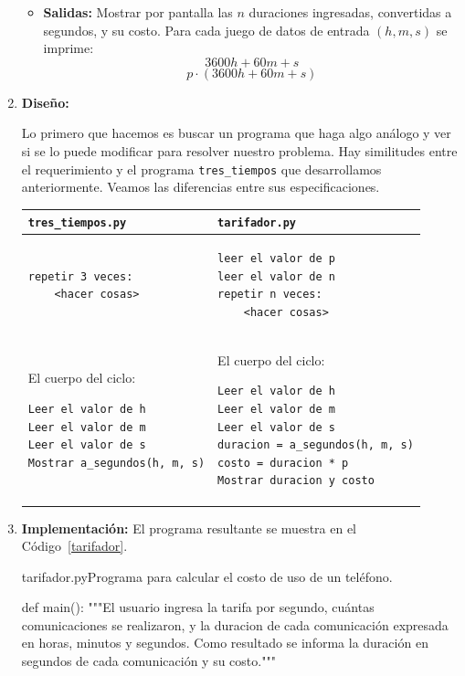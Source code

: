 \begin{solucion}
\begin{enumerate}
\begin{itemize}
\item {\bf Salidas: } Mostrar por pantalla las $n$ duraciones ingresadas, convertidas a segundos,
y su costo.
Para cada juego de datos de entrada $(h, m, s)$ se imprime:
$$ 3600 h + 60 m + s $$
$$ p \cdot (3600 h + 60 m + s) $$
\end{itemize}

\item {\bf Diseño:}

Lo primero que hacemos es buscar un programa que haga algo análogo y ver si se
lo puede modificar para resolver nuestro problema.  Hay similitudes entre el requerimiento
y el programa \lstinline+tres_tiempos+ que desarrollamos anteriormente. 
Veamos las diferencias entre sus especificaciones.

\begin{center}
\begin{tabular}{p{} p{}}
\lstinline!tres_tiempos.py! & \lstinline!tarifador.py!
\\
\hline
\begin{verbatim}
repetir 3 veces:
    <hacer cosas>
\end{verbatim}
&
\begin{verbatim}
leer el valor de p
leer el valor de n
repetir n veces:
    <hacer cosas>
\end{verbatim}
\\
\hline
El cuerpo del ciclo:
{\footnotesize
\begin{verbatim}
Leer el valor de h
Leer el valor de m
Leer el valor de s
Mostrar a_segundos(h, m, s)
\end{verbatim}
} &
El cuerpo del ciclo:
{\footnotesize
\begin{verbatim}
Leer el valor de h
Leer el valor de m
Leer el valor de s
duracion = a_segundos(h, m, s)
costo = duracion * p
Mostrar duracion y costo
\end{verbatim}
} \\
\end{tabular}
\end{center}

\item {\bf Implementación:} El programa resultante se muestra en el Código~\ref{tarifador}.

\begin{codigo}{\label{tarifador} tarifador.py}{Programa para calcular el costo
    de uso de un teléfono.}
\begin{codigo-python}
def main():
    """El usuario ingresa la tarifa por segundo, cuántas
       comunicaciones se realizaron, y la duracion de cada
       comunicación expresada en horas, minutos y segundos. Como
       resultado se informa la duración en segundos de cada
       comunicación y su costo."""


\end{codigo-python}
\end{codigo}
\end{enumerate}
\end{solucion}
